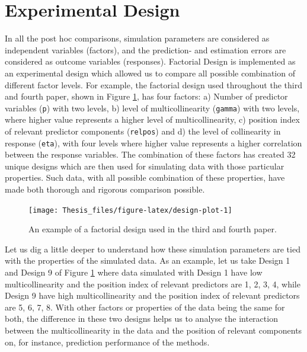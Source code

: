 \documentclass[11pt,twoside,openright,titlepage,
  headinclude,footinclude,BCOR=5mm,
  numbers=noenddot,cleardoublepage=empty,
  tablecaptionabove, dottedtoc,
  bibliography=totoc,paper=a4]{scrreprt}
\begin{document}
\hypertarget{experimental-design}{%
\section{Experimental Design}\label{experimental-design}}

In all the post hoc comparisons, simulation parameters are considered as independent variables (factors), and the prediction- and estimation errors are considered as outcome variables (responses). Factorial Design is implemented as an experimental design which allowed us to compare all possible combination of different factor levels. For example, the factorial design used throughout the third and fourth paper, shown in Figure \ref{fig:design-plot}, has four factors: a) Number of predictor variables (\texttt{p}) with two levels, b) level of multicollinearity (\texttt{gamma}) with two levels, where higher value represents a higher level of multicollinearity, c) position index of relevant predictor components (\texttt{relpos}) and d) the level of collinearity in response (\texttt{eta}), with four levels where higher value represents a higher correlation between the response variables. The combination of these factors has created 32 unique designs which are then used for simulating data with those particular properties. Such data, with all possible combination of these properties, have made both thorough and rigorous comparison possible.



\begin{figure}[!htb]
\texttt{[image: Thesis\_files/figure-latex/design-plot-1]} \caption{An example of a factorial design used in the third and fourth paper.}\label{fig:design-plot}
\end{figure}

Let us dig a little deeper to understand how these simulation parameters are tied with the properties of the simulated data. As an example, let us take Design 1 and Design 9 of Figure \ref{fig:design-plot} where data simulated with Design 1 have low multicollinearity and the position index of relevant predictors are 1, 2, 3, 4, while Design 9 have high multicollinearity and the position index of relevant predictors are 5, 6, 7, 8. With other factors or properties of the data being the same for both, the difference in these two designs helps us to analyse the interaction between the multicollinearity in the data and the position of relevant components on, for instance, prediction performance of the methods.
\end{document}
